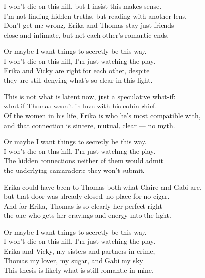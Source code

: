 \begin{lyrics}
I won't die on this hill, but I insist this makes sense.\\
I'm not finding hidden truths, but reading with another lens.\\
Don't get me wrong, Erika and Thomas stay just friends—\\
close and intimate, but not each other's romantic ends.

Or maybe I want things to secretly be this way.\\
I won't die on this hill, I'm just watching the play.\\
Erika and Vicky are right for each other, despite\\
they are still denying what's so clear in this light.

This is not what is latent now, just a speculative what-if:\\
what if Thomas wasn't in love with his cabin chief.\\
Of the women in his life, Erika is who he's most compatible with,\\
and that connection is sincere, mutual, clear — no myth.

Or maybe I want things to secretly be this way.\\
I won't die on this hill, I'm just watching the play.\\
The hidden connections neither of them would admit,\\
the underlying camaraderie they won’t submit.

Erika could have been to Thomas both what Claire and Gabi are,\\
but that door was already closed, no place for no cigar.\\
And for Erika, Thomas is so clearly her perfect right—\\
the one who gets her cravings and energy into the light.

Or maybe I want things to secretly be this way.\\
I won't die on this hill, I'm just watching the play.\\
Erika and Vicky, my sisters and partners in crime,\\
Thomas my lover, my sugar, and Gabi my sky.\\
This thesis is likely what is still romantic in mine.
\end{lyrics}

